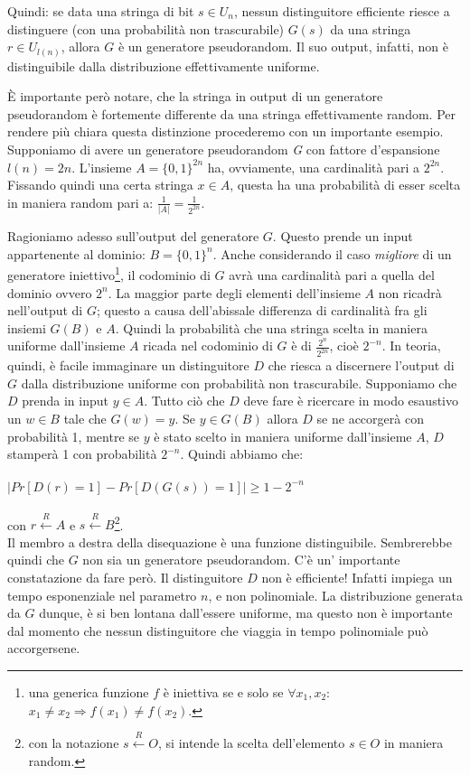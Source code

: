 \documentclass[a4paper,openright,twoside,12pt]{report}
\begin{document}
Quindi: se data una stringa di bit $s \in U_{n}$, nessun distinguitore efficiente riesce a distinguere (con una probabilit\`a non trascurabile) $G(s)$ da una stringa $r \in U_{l(n)}$, allora 
$G$ \`e un generatore pseudorandom. Il suo output, infatti, non \`e distinguibile dalla distribuzione effettivamente uniforme.

\`E importante per\`o notare, che la stringa in output di un generatore pseudorandom \`e fortemente differente da una stringa effettivamente random. Per rendere pi\`u chiara questa distinzione procederemo
con un importante esempio.
Supponiamo di avere un generatore pseudorandom \emph{G} con fattore d'espansione $l(n)=2n$.
L'insieme $A=\{0, 1\}^{2n}$ ha, ovviamente, una cardinalit\`a pari a $2^{2n}$. Fissando quindi una certa stringa $x \in A$, 
questa ha una probabilit\`a di esser scelta in maniera random pari a: $\frac{1}{\lvert A \rvert} = \frac{1}{2^{2n}}$.

Ragioniamo adesso sull'output del generatore $G$. Questo prende un input appartenente al dominio: $B=\{0, 1\}^{n}$. 
Anche considerando il caso \emph{migliore} di un generatore iniettivo\footnote{una generica funzione $f$ \`e iniettiva se e solo se $\forall x_1, x_2:$ $x_1 \neq x_2 \Rightarrow f(x_1) \neq f(x_2)$.},
il codominio di $G$ avr\`a una cardinalit\`a pari a quella del dominio ovvero $2^{n}$. La maggior parte degli elementi dell'insieme $A$ non ricadr\`a 
nell'output di $G$; questo a causa dell'abissale differenza di cardinalit\`a fra gli insiemi $G(B)$ e $A$.
Quindi la probabilit\`a che una stringa scelta in maniera uniforme dall'insieme $A$ ricada nel codominio di $G$ \`e di $\frac{2^{n}}{2^{2n}}$, cio\`e $2^{-n}$.
In teoria, quindi, \`e facile immaginare un distinguitore $D$ che riesca a discernere l'output di $G$ dalla distribuzione uniforme con probabilit\`a non trascurabile.
Supponiamo che $D$ prenda in input $y \in A$. Tutto ci\`o che $D$ deve fare \`e ricercare in modo esaustivo un $w \in B$ tale che $G(w) = y$.
Se $y \in G(B)$ allora $D$ se ne accorger\`a con probabilit\`a 1, mentre se $y$ \`e stato scelto in maniera uniforme dall'insieme $A$, $D$ stamper\`a 1 con probabilit\`a $2^{-n}$. 
Quindi abbiamo che: \\
\\
$\lvert Pr[D(r)=1] - Pr[D(G(s))=1]\rvert \geq 1 - 2^{-n}$\\
\\con $r \xleftarrow{R} A$ e $s \xleftarrow{R} B$\footnote{con la notazione $s \xleftarrow{R} O$, si intende la scelta dell'elemento $s \in O$ in maniera random.}.\\ 
Il membro a destra della disequazione \`e una funzione distinguibile. Sembrerebbe quindi che $G$ non sia un generatore pseudorandom.
C'\`e un' importante constatazione da fare per\`o. Il distinguitore $D$ non \`e efficiente! Infatti impiega un tempo esponenziale nel parametro $n$, e non polinomiale.
La distribuzione generata da $G$ dunque, \`e si ben lontana dall'essere uniforme, ma questo non \`e importante dal momento che nessun distinguitore che viaggia in tempo polinomiale pu\`o 
accorgersene.
\end{document}
